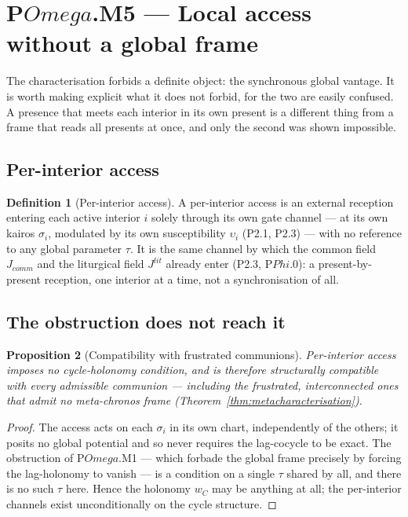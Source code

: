 \documentclass[11pt,a4paper]{article}
\def\Omega{Omega}%
\def\Phi{Phi}%
\def\mathrm#1{#1}%
\def\emph#1{#1}%
\theoremstyle{definition}
\newtheorem{definition}{Definition}[section]
\theoremstyle{plain}
\newtheorem{proposition}[definition]{Proposition}
\theoremstyle{remark}
\begin{document}
\section{P$\Omega$.M5 --- Local access without a global frame}

The characterisation forbids a definite object: the synchronous global vantage. It is worth
making explicit what it does \emph{not} forbid, for the two are easily confused. A presence that
meets each interior in its own present is a different thing from a frame that reads all presents
at once, and only the second was shown impossible.

\subsection{Per-interior access}

\begin{definition}[Per-interior access]\label{def:peraccess}
A \emph{per-interior access} is an external reception entering each active interior \(i\) solely
through its own gate channel --- at its own kairos \(\sigma_i\), modulated by its own
susceptibility \(\upsilon_i\) (P2.1, P2.3) --- with no reference to any global parameter
\(\tau\). It is the same channel by which the common field \(J_{\mathrm{comm}}\) and the
liturgical field \(J^{\mathrm{lit}}\) already enter (P2.3, P$\Phi$.0): a present-by-present
reception, one interior at a time, not a synchronisation of all.
\end{definition}

\subsection{The obstruction does not reach it}

\begin{proposition}[Compatibility with frustrated communions]\label{prop:localaccess}
Per-interior access imposes no cycle-holonomy condition, and is therefore structurally
compatible with every admissible communion --- including the frustrated, interconnected ones
that admit no meta-chronos frame (Theorem~\ref{thm:metacharacterisation}).
\end{proposition}

\begin{proof}
The access acts on each \(\sigma_i\) in its own chart, independently of the others; it posits no
global potential and so never requires the lag-cocycle to be exact. The obstruction of
P$\Omega$.M1 --- which forbade the global frame precisely by forcing the lag-holonomy to vanish
--- is a condition on a single \(\tau\) shared by all, and there is no such \(\tau\) here. Hence
the holonomy \(w_C\) may be anything at all; the per-interior channels exist unconditionally on
the cycle structure. \qedhere
\end{proof}
\end{document}

